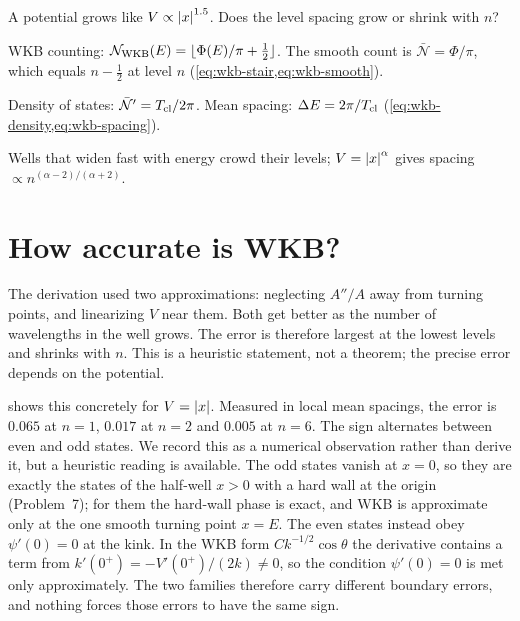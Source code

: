 \begin{checkpoint}
A potential grows like $V\propto\left\lvert x\right\rvert^{1.5}$. Does the level spacing grow or shrink with $n$?
\end{checkpoint}

\begin{keyideas}
\item WKB counting: $\mathcal N_{\rm WKB}(E)=\lfloor\Phi(E)/\pi+\frac12\rfloor$. The smooth count is $\bar{\mathcal N}=\Phi/\pi$, which equals $n-\frac12$ at level $n$ (\cref{eq:wkb-stair,eq:wkb-smooth}).
\item Density of states: $\bar{\mathcal N}'=T_{\rm cl}/2\pi$. Mean spacing: $\Delta E=2\pi/T_{\rm cl}$ (\cref{eq:wkb-density,eq:wkb-spacing}).
\item Wells that widen fast with energy crowd their levels; $V=\left\lvert x\right\rvert^\alpha$ gives spacing $\propto n^{(\alpha-2)/(\alpha+2)}$.
\end{keyideas}

\section{How accurate is WKB?}\label{sec:wkb-accuracy}

The derivation used two approximations: neglecting $A''/A$ away from turning points, and linearizing $V$ near them. Both get better as the number of wavelengths in the well grows. The error is therefore largest at the lowest levels and shrinks with $n$. This is a heuristic statement, not a theorem; the precise error depends on the potential.

 shows this concretely for $V=\left\lvert x\right\rvert$. Measured in local mean spacings, the error is $0.065$ at $n=1$, $0.017$ at $n=2$ and $0.005$ at $n=6$. The sign alternates between even and odd states. We record this as a numerical observation rather than derive it, but a heuristic reading is available. The odd states vanish at $x=0$, so they are exactly the states of the half-well $x>0$ with a hard wall at the origin (Problem~7); for them the hard-wall phase is exact, and WKB is approximate only at the one smooth turning point $x=E$. The even states instead obey $\psi'(0)=0$ at the kink. In the WKB form $Ck^{-1/2}\cos\theta$ the derivative contains a term from $k'(0^+)=-V'(0^+)/(2k)\ne0$, so the condition $\psi'(0)=0$ is met only approximately. The two families therefore carry different boundary errors, and nothing forces those errors to have the same sign.

